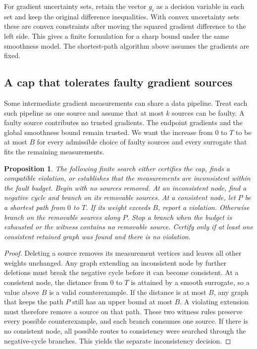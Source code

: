\documentclass[11pt]{article}
\newtheorem{proposition}{Proposition}
\begin{document}
For gradient uncertainty sets, retain the vector $g_i$ as
a decision variable in each set and keep the original
difference inequalities. With convex uncertainty sets these
are convex constraints after moving the squared gradient
difference to the left side. This gives a finite formulation
for a sharp bound under the same smoothness model. The
shortest-path algorithm above assumes the gradients are fixed.

\subsection{A cap that tolerates faulty gradient sources}
Some intermediate gradient measurements can share a data pipeline.
Treat each such pipeline as one source and assume that at most
$k$ sources can be faulty. A faulty source contributes no trusted
gradients. The endpoint gradients and the global smoothness bound
remain trusted. We want the increase from $0$ to $T$ to be at most
$B$ for every admissible choice of faulty sources and every
surrogate that fits the remaining measurements.

\begin{proposition}
The following finite search either certifies the cap, finds a
compatible violation, or establishes that the measurements are
inconsistent within the fault budget. Begin with no sources removed.
At an inconsistent node, find a negative cycle and branch on its
removable sources. At a consistent node, let $P$ be a shortest
path from $0$ to $T$. If its weight exceeds $B$, report a violation.
Otherwise branch on the removable sources along $P$. Stop a branch
when the budget is exhausted or the witness contains no removable
source. Certify only if at least one consistent retained graph
was found and there is no violation.
\end{proposition}
\begin{proof}
Deleting a source removes its measurement vertices and leaves
all other weights unchanged. Any graph extending an inconsistent
node by further deletions must break the negative cycle before
it can become consistent. At a consistent node, the distance from
$0$ to $T$ is attained by a smooth surrogate, so a value above
$B$ is a valid counterexample. If the distance is at most $B$,
any graph that keeps the path $P$ still has an upper bound at
most $B$. A violating extension must therefore remove a source
on that path. These two witness rules preserve every possible
counterexample, and each branch consumes one source. If there
is no consistent node, all possible routes to consistency were
searched through the negative-cycle branches. This yields the
separate inconsistency decision.
\end{proof}
\end{document}
